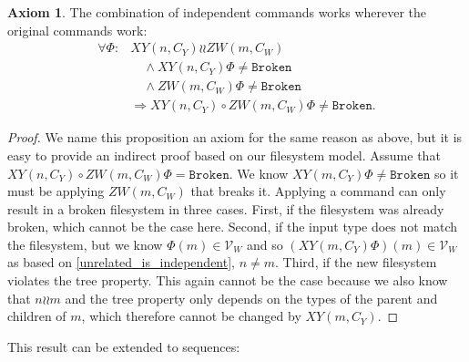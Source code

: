 \documentclass[12pt]{article}
\newcommand{\setvx}[1]{\mathcal{V}_{#1}}
\newcommand{\fsbroken}{\mathtt{Broken}} %
\newcommand{\FS}{\Phi} %
\newcommand{\fscommand}[2]{{#1#2}}
\newcommand{\cxy}{\fscommand{X}{Y}}
\newcommand{\czw}{\fscommand{Z}{W}}
\newcommand{\cc}{\circ} %
\newcommand{\indep}{\mathrel{\wr\wr}} %
\newcommand{\unrel}{\indep} %
\theoremstyle{definition}
\newtheorem{myax}{Axiom}
\begin{document}
\begin{myax}\label{combine_independent_commands}
The combination of independent commands works wherever the original commands work:
\begin{align*}
\forall\FS: &\cxy(n,C_Y)\indep \czw(m,C_W) \\
&\quad\wedge \cxy(n,C_Y)\FS\neq\fsbroken \\
&\quad\wedge \czw(m,C_W)\FS\neq\fsbroken \\
&\Rightarrow \cxy(n,C_Y)\cc \czw(m,C_W)\FS\neq\fsbroken.
\end{align*}
\end{myax}
\begin{proof}
We name this proposition an axiom for the same reason as above,
but it is easy to provide an indirect proof based on our filesystem model.
Assume that $\cxy(n,C_Y)\cc \czw(m,C_W)\FS=\fsbroken$.
We know $\cxy(m,C_Y)\FS\neq\fsbroken$ so it must be applying 
$\czw(m,C_W)$ that breaks it.
Applying a command can only result in a broken filesystem in three cases.
First, if the filesystem was already broken, which cannot be the case here.
Second, if the input type does not match the filesystem,
but we know $\FS(m)\in\setvx{W}$ and so
$(\cxy(m,C_Y)\FS)(m)\in\setvx{W}$ as based on \cref{unrelated_is_independent}, $n\neq m$.
Third, if the new filesystem violates the tree property.
This again cannot be the case because we also know that $n\unrel m$
and the tree property only depends on the types of the parent and children of $m$,
which therefore cannot be changed by $\cxy(m,C_Y)$.
\end{proof}

This result can be extended to sequences:
\end{document}
